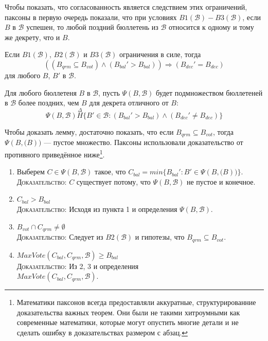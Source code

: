 \documentclass[12pt, a4paper]{article} %
\begin{document}
Чтобы показать, что согласованность является следствием этих ограничений, паксоны в первую очередь показали, что при условиях $B1(\mathcal{B}) - B3(\mathcal{B})$, если $B$ в $\mathcal{B}$ успешен, то любой поздний бюллетень из $\mathcal{B}$ относится к одному и тому же декрету, что и $B$.

\begin{lemma}
Если $B1(\mathcal{B})$, $B2(\mathcal{B})$ и $B3(\mathcal{B})$ ограничения в силе, тогда
\[
    ((B_{qrm} \subseteq B_{vot}) \land (B_{bal}' > B_{bal})) \Rightarrow (B_{dec}' = B_{dec})
\]
для любого $B$, $B'$ в $\mathcal{B}$.
\end{lemma}
\begin{lemmaproof}
Для любого бюллетеня $B$ в $\mathcal{B}$, пусть $\Psi(B, \mathcal{B})$ будет подмножеством бюллетеней в $\mathcal{B}$ более поздних, чем $B$ для декрета отличного от $B$:
\[
    \Psi(B, \mathcal{B}) \overset{\Delta}{H} \{B' \in \mathcal{B} : (B_{bal}' > B_{bal}) \land (B_{dec}' \neq B_{dec})\}
\]

Чтобы доказать лемму, достаточно показать, что если $B_{qrm} \subseteq B_{vot}$, тогда $\Psi(B, \mathcal(B))$ --- пустое множество. Паксоны использовали доказательство от противного приведённое ниже\footnote{Математики паксонов всегда предоставляли аккуратные, структурированние доказательства важных теорем. Они были не такими хитроумными как современные математики, которые могут опустить многие детали и не сделать ошибку в доказательствах размером с абзац.}.
\begin{enumerate}
    \item Выберем $C \in \Psi(B, \mathcal{B})$ такое, что $C_{bal} = min \{B_{bal}' : B' \in \Psi(B, \mathcal(B))\}$. \\
          \textsc{Доказательство}: $C$ существует потому, что $\Psi(B, \mathcal{B})$ не пустое и конечное.
    
    \item $C_{bal} > B_{bal}$\\
          \textsc{Доказательство}: Исходя из пункта 1 и определения $\Psi(B, \mathcal{B})$.

    \item $B_{vot} \cap C_{qrm} \neq \emptyset$\\
          \textsc{Доказательство}: Следует из  $B2(\mathcal{B})$ и гипотезы, что $B_{qrm} \subseteq B_{vot}$.
    
    \item $MaxVote(C_{bal}, C_{qrm}, \mathcal{B}) \geqslant B_{bal}$\\
          \textsc{Доказательство}: Из 2, 3 и определения\\
           $MaxVote(C_{bal}, C_{qrm}, \mathcal{B})$.


\end{enumerate}
\end{lemmaproof}
\end{document}
